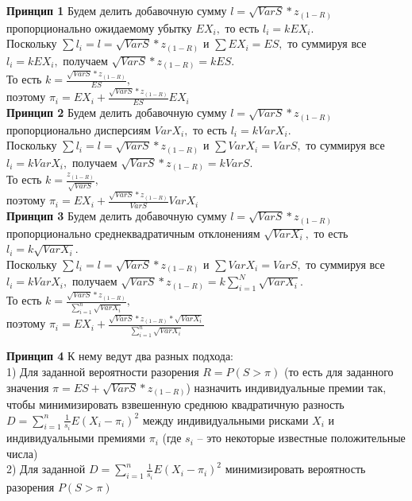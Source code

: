\documentclass[12pt,a4paper]{article}
\begin{document}
 {\bf Принцип 1  } Будем делить добавочную сумму $l=  \sqrt{VarS}*z_{(1-R)}$ пропорционально ожидаемому убытку $EX_i,$  то есть $l_i = kEX_i.$\\
 Поскольку $\sum l_i = l = \sqrt{VarS}*z_{(1-R)}$ и $\sum EX_i = ES,$  то  суммируя все $l_i = kEX_i, $ получаем $ \sqrt{VarS}*z_{(1-R)} = kES.$\\
 То есть $k=\frac {\sqrt{VarS}*z_{(1-R)} }{ES}, $ \\
 поэтому  $ \boxed  { \pi_i = EX_i +  \frac {\sqrt{VarS}*z_{(1-R)} }{ES}  EX_i } $\\
 
  {\bf Принцип 2  } Будем делить добавочную сумму $l=  \sqrt{VarS}*z_{(1-R)}$ пропорционально дисперсиям  $VarX_i,$  то есть $l_i = kVarX_i.$\\
 Поскольку $\sum l_i = l = \sqrt{VarS}*z_{(1-R)}$ и $\sum VarX_i = VarS,$  то  суммируя все $l_i = kVarX_i, $ получаем $ \sqrt{VarS}*z_{(1-R)} = kVarS.$\\
 То есть $k=\frac {z_{(1-R)} }{\sqrt{VarS}}, $ \\
 поэтому  $ \boxed  { \pi_i = EX_i +  \frac {\sqrt{VarS}*z_{(1-R)} }{VarS}  VarX_i } $\\
 
  {\bf Принцип 3  } Будем делить добавочную сумму $l=  \sqrt{VarS}*z_{(1-R)}$ пропорционально среднеквадратичным 
  отклонениям  $ \sqrt{VarX_i},$  то есть $l_i = k\sqrt{VarX_i}.$\\
 Поскольку $\sum l_i = l = \sqrt{VarS}*z_{(1-R)}$ и $\sum VarX_i = VarS,$  то  суммируя все $l_i = kVarX_i, $
  получаем $ \sqrt{VarS}*z_{(1-R)} = k\sum\limits_{i=1}^{N} \sqrt{VarX_i}.$\\
 То есть $k=\frac {\sqrt{VarS}*z_{(1-R)} }{\sum\limits_{i=1}^{n} \sqrt{VarX_i}}, $ \\
 поэтому  $ \boxed  { \pi_i = EX_i +  \frac {\sqrt{VarS}*z_{(1-R)}  * \sqrt{VarX_i}}{\sum\limits_{i=1}^{n} \sqrt{VarX_i}} }$



 {\bf Принцип 4  }  К нему ведут два разных подхода:\\
 1) Для заданной вероятности разорения $R=P(S>\pi)$  (то есть для заданного значения $\pi=ES + \sqrt{VarS}*z_{(1-R)}$)  назначить индивидуальные премии так, чтобы минимизировать взвешенную среднюю  квадратичную  разность $D= \sum \limits_{i=1}^{n} \frac {1}{s_i} E(X_i-\pi_i)^2$ между индивидуальными рисками $X_i$ и индивидуальными премиями $\pi_i$ (где $s_i$ -- это некоторые известные положительные числа)\\
 2) Для заданной $D=\sum \limits_{i=1}^{n} \frac {1}{s_i} E(X_i-\pi_i)^2$  минимизировать вероятность разорения $P(S>\pi)$\\
 
\end{document}
